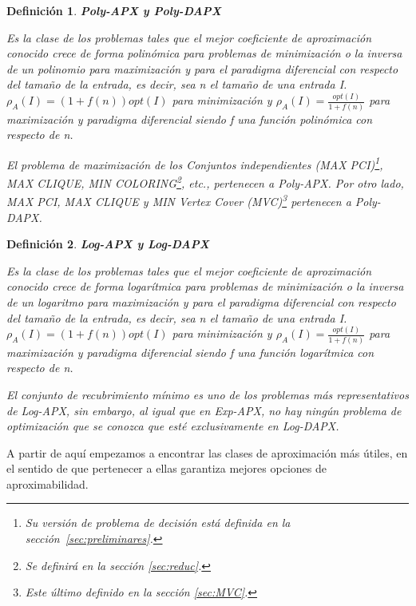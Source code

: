 \documentclass[a4paper,12pt,titlepage]{article}
\newtheorem{defi}{Definici\'on}[section]
\begin{document}
\begin{defi}

\textbf{Poly-APX y Poly-DAPX}

Es la clase de los problemas tales que el mejor coeficiente de aproximaci\'on conocido crece de forma polin\'omica para problemas de minimizaci\'on o la inversa de un polinomio para maximizaci\'on y para el paradigma diferencial con respecto del tamaño de la entrada, es decir, sea n el tamaño de una entrada I.
$\rho_{A}(I)=(1+f(n))opt(I)$ para minimizaci\'on y $\rho_{A}(I)=\frac{opt(I)}{1+f(n)}$ para maximizaci\'on y paradigma diferencial siendo f una funci\'on polin\'omica con respecto de n.

El problema de maximizaci\'on de los Conjuntos independientes (MAX PCI)\footnote{Su versi\'on de problema de decisi\'on est\'a definida en la secci\'on~\ref{sec:preliminares}.}, MAX CLIQUE, MIN COLORING\footnote{Se definir\'a en la secci\'on \ref{sec:reduc}.}, etc., pertenecen a Poly-APX. Por otro lado, MAX PCI, MAX CLIQUE y MIN Vertex Cover (MVC)\footnote{Este \'ultimo definido en la secci\'on \ref{sec:MVC}.} pertenecen a Poly-DAPX.

\end{defi}

\begin{defi}

\textbf{Log-APX y Log-DAPX}

Es la clase de los problemas tales que el mejor coeficiente de aproximaci\'on conocido crece de forma logar\'itmica para problemas de minimizaci\'on o la inversa de un logaritmo para maximizaci\'on y para el paradigma diferencial con respecto del tamaño de la entrada, es decir, sea n el tamaño de una entrada I.
$\rho_{A}(I)=(1+f(n))opt(I)$ para minimizaci\'on y $\rho_{A}(I)=\frac{opt(I)}{1+f(n)}$ para maximizaci\'on y paradigma diferencial siendo f una funci\'on logar\'itmica con respecto de n.

El conjunto de recubrimiento m\'inimo es uno de los problemas m\'as representativos de Log-APX, sin embargo, al igual que en Exp-APX, no hay ning\'un problema de optimizaci\'on que se conozca que est\'e exclusivamente en Log-DAPX.

\end{defi}

A partir de aqu\'i empezamos a encontrar las clases de aproximaci\'on m\'as \'utiles, en el sentido de que pertenecer a ellas garantiza mejores opciones de aproximabilidad.
\end{document}

